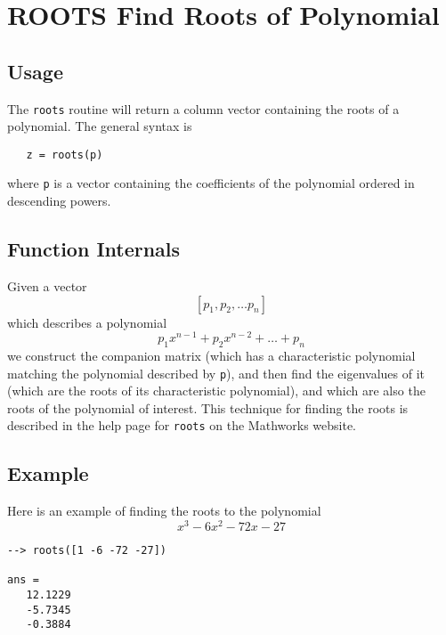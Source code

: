 \section{ROOTS Find Roots of Polynomial}

\subsection{Usage}

The \verb|roots| routine will return a column vector containing the
roots of a polynomial.  The general syntax is
\begin{verbatim}
   z = roots(p)
\end{verbatim}
where \verb|p| is a vector containing the coefficients of the polynomial
ordered in descending powers.  
\subsection{Function Internals}

Given a vector 
\[
   [p_1, p_2, \dots p_n]
\]
which describes a polynomial
\[
   p_1 x^{n-1} + p_2 x^{n-2} + \dots + p_n
\]
we construct the companion matrix (which has a characteristic polynomial
matching the polynomial described by \verb|p|), and then find the eigenvalues
of it (which are the roots of its characteristic polynomial), and
which are also the roots of the polynomial of interest.  This technique
for finding the roots is described in the help page for \verb|roots| on the Mathworks
website.
\subsection{Example}

Here is an example of finding the roots to the polynomial
\[
   x^3 - 6x^2 - 72x - 27
\]
\begin{verbatim}
--> roots([1 -6 -72 -27])

ans = 
   12.1229 
   -5.7345 
   -0.3884 
\end{verbatim}
